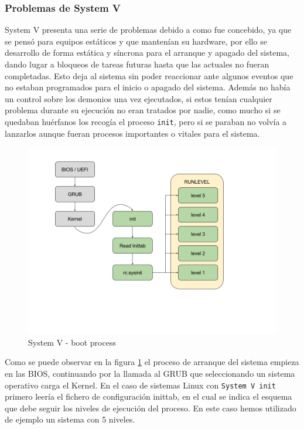 \subsubsection{Problemas de System V}
System V presenta una serie de problemas debido a como fue concebido, ya que se pensó para equipos estáticos y que mantenían su hardware, por ello se desarrollo de forma estática y síncrona para el arranque y apagado del sistema, dando lugar a bloqueos de tareas futuras hasta que las actuales no fueran completadas. Esto deja al sistema sin poder reaccionar ante algunos eventos que no estaban programados para el inicio o apagado del sistema. Además no había un control sobre los demonios una vez ejecutados, si estos tenían cualquier problema durante su ejecución no eran tratados por nadie, como mucho si se quedaban huérfanos los recogía el proceso \texttt{init}, pero si se paraban no volvía a lanzarlos aunque fueran procesos importantes o vitales para el sistema.

\begin{figure}[H] %
\centering
\includegraphics[scale=0.4]{./imagenes/System_V.png} 
\caption{System V - boot process} \label{fig:System_V}
\end{figure}

Como se puede observar en la figura \ref{fig:System_V} el proceso de arranque del sistema empieza en las BIOS, continuando por la llamada al GRUB que seleccionando un sistema operativo carga el Kernel. En el caso de sistemas Linux con \texttt{System V init} primero leería el fichero de configuración inittab, en el cual se indica el esquema que debe seguir los niveles de ejecución del proceso. En este caso hemos utilizado de ejemplo un sistema con 5 niveles.

